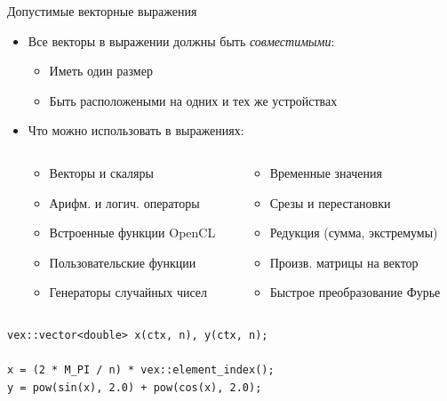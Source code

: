 \documentclass[@BEAMER_OPTIONS@]{beamer}
\begin{document}
\begin{frame}[fragile]{Допустимые векторные выражения}
    \begin{itemize}
        \item Все векторы в выражении должны быть \emph{совместимыми}:
            \begin{itemize}
                \item Иметь один размер
                \item Быть расположеными на одних и тех же устройствах
            \end{itemize}
        \item Что можно использовать в выражениях:
            \begin{columns}
                \begin{column}{0.4\textwidth}
                    \begin{itemize}
                        \item Векторы и скаляры
                        \item Арифм. и логич. операторы
                        \item Встроенные функции OpenCL
                        \item Пользовательские функции
                        \item Генераторы случайных чисел
                    \end{itemize}
                \end{column}
                \begin{column}{0.4\textwidth}
                    \begin{itemize}
                        \item Временные значения
                        \item Срезы и перестановки
                        \item Редукция (сумма, экстремумы)
                        \item Произв. матрицы на вектор
                        \item Быстрое преобразование Фурье
                    \end{itemize}
                \end{column}
            \end{columns}
    \end{itemize}
    \begin{exampleblock}{}
        \begin{lstlisting}
vex::vector<double> x(ctx, n), y(ctx, n);

x = (2 * M_PI / n) * vex::element_index();
y = pow(sin(x), 2.0) + pow(cos(x), 2.0);
        \end{lstlisting}
    \end{exampleblock}
\end{frame}
\end{document}
